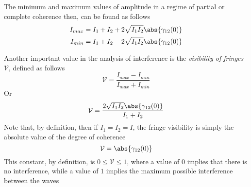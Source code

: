 \documentclass[../electromagnetism.tex]{subfiles}
\begin{document}
The minimum and maximum values of amplitude in a regime of partial or complete coherence then, can be found as follows
\begin{equation}
	\begin{aligned}
		I_{max}&= I_1+I_2+2\sqrt{I_1I_2}\abs{\gamma_{12}(0)}\\
		I_{min}&= I_1+I_2-2\sqrt{I_1I_2}\abs{\gamma_{12}(0)}
	\end{aligned}
	\label{eq:maxmininterferenceint}
\end{equation}
\begin{dfn}
	Another important value in the analysis of interference is the \emph{visibility of fringes} $\mathcal{V}$, defined as follows
	\begin{equation}
		\mathcal{V}=\frac{I_{max}-I_{min}}{I_{max}+I_{min}}
		\label{eq:visibilitydef}
	\end{equation}
	Or
	\begin{equation}
		\mathcal{V}=\frac{2\sqrt{I_1I_2}\abs{\gamma_{12}(0)}}{I_1+I_2}
		\label{eq:visibilitydef2}
	\end{equation}
	Note that, by definition, then if $I_1=I_2=I$, the fringe visibility is simply the absolute value of the degree of coherence
	\begin{equation*}
		\mathcal{V}=\abs{\gamma_{12}(0)}
	\end{equation*}
	This constant, by definition, is $0\le\mathcal{V}\le1$, where a value of $0$ implies that there is no interference, while a value of $1$ implies the maximum possible interference between the waves
\end{dfn}
\end{document}

